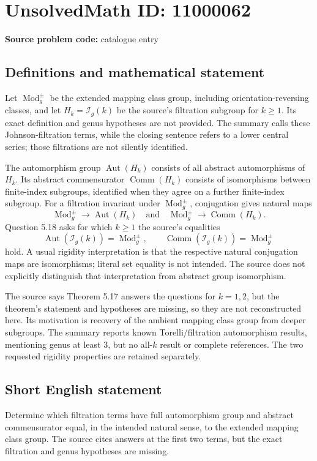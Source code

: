 \documentclass[11pt]{article}
\begin{document}
\section*{UnsolvedMath ID: 11000062}
\textbf{Source problem code:} catalogue entry
\subsection{Definitions and mathematical statement}
Let \(\operatorname{Mod}_g^{\pm}\) be the extended mapping class group, including orientation-reversing classes, and let \(H_k=\mathcal I_g(k)\) be the source's filtration subgroup for \(k\ge1\). Its exact definition and genus hypotheses are not provided. The summary calls these Johnson-filtration terms, while the closing sentence refers to a lower central series; those filtrations are not silently identified.

The automorphism group \(\operatorname{Aut}(H_k)\) consists of all abstract automorphisms of \(H_k\). Its abstract commensurator \(\operatorname{Comm}(H_k)\) consists of isomorphisms between finite-index subgroups, identified when they agree on a further finite-index subgroup. For a filtration invariant under \(\operatorname{Mod}_g^{\pm}\), conjugation gives natural maps
\[
 \operatorname{Mod}_g^{\pm}\longrightarrow\operatorname{Aut}(H_k)
 \quad\text{and}\quad
 \operatorname{Mod}_g^{\pm}\longrightarrow\operatorname{Comm}(H_k).
\]
Question 5.18 asks for which \(k\ge1\) the source's equalities
\[
 \operatorname{Aut}(\mathcal I_g(k))=\operatorname{Mod}_g^{\pm},
 \qquad
 \operatorname{Comm}(\mathcal I_g(k))=\operatorname{Mod}_g^{\pm}
\]
hold. A usual rigidity interpretation is that the respective natural conjugation maps are isomorphisms; literal set equality is not intended. The source does not explicitly distinguish that interpretation from abstract group isomorphism.

The source says Theorem 5.17 answers the questions for \(k=1,2\), but the theorem's statement and hypotheses are missing, so they are not reconstructed here. Its motivation is recovery of the ambient mapping class group from deeper subgroups. The summary reports known Torelli/filtration automorphism results, mentioning genus at least \(3\), but no all-\(k\) result or complete references. The two requested rigidity properties are retained separately.
\subsection{Short English statement}
Determine which filtration terms have full automorphism group and abstract commensurator equal, in the intended natural sense, to the extended mapping class group. The source cites answers at the first two terms, but the exact filtration and genus hypotheses are missing.
\end{document}

